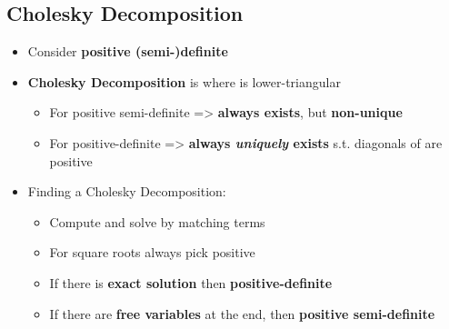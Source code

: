\subsection*{Cholesky Decomposition}

\begin{itemize}

  \item
        Consider \textbf{positive (semi-)definite}
  \item
        \textbf{Cholesky Decomposition} is  where 
        is lower-triangular

        \begin{itemize}

          \item
                For positive semi-definite =\textgreater{} \textbf{always exists},
                but \textbf{non-unique}
          \item
                For positive-definite =\textgreater{} \textbf{always \emph{uniquely}
                  exists} s.t. diagonals of  are positive
        \end{itemize}
  \item
        Finding a Cholesky Decomposition:

        \begin{itemize}

          \item
                Compute  and solve  by matching terms
          \item
                For square roots always pick positive
          \item
                If there is \textbf{exact solution} then \textbf{positive-definite}
          \item
                If there are \textbf{free variables} at the end, then
                \textbf{positive semi-definite}

                \begin{itemize}


\end{itemize}
\end{itemize}
\end{itemize}
